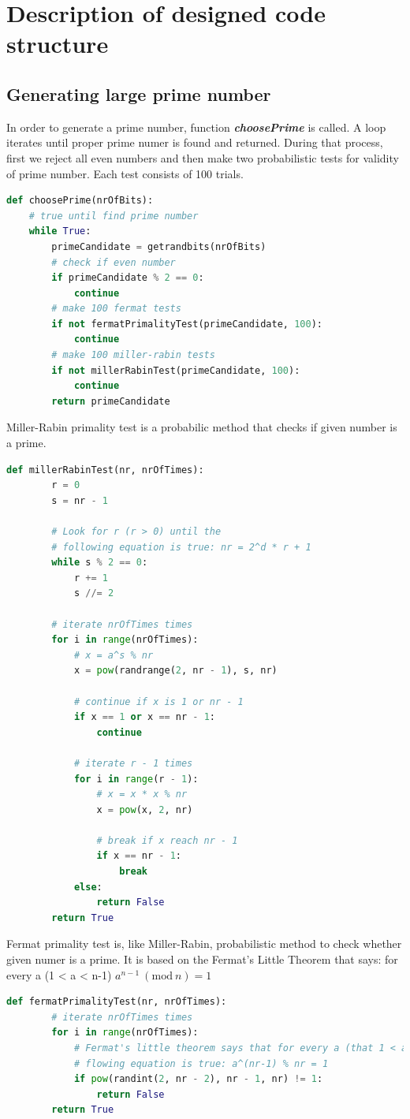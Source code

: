 \documentclass[a4paper,12pt]{article}
\newcommand{\Mod}[1]{\ (\mathrm{mod}\ #1)}
\begin{document}
\section{Description of designed code structure}
\subsection{Generating large prime number}
In order to generate a prime number, function \textbf{\textit{choosePrime}} is called. A loop iterates until proper prime numer is found and returned. 
During that process, first we reject all even numbers and then make two probabilistic tests for validity of prime number. Each test consists of 100 trials.
\begin{lstlisting}[language=Python]
  def choosePrime(nrOfBits):
    # true until find prime number
    while True:
        primeCandidate = getrandbits(nrOfBits)
        # check if even number
        if primeCandidate % 2 == 0:
            continue
        # make 100 fermat tests 
        if not fermatPrimalityTest(primeCandidate, 100):
            continue
        # make 100 miller-rabin tests
        if not millerRabinTest(primeCandidate, 100):
            continue
        return primeCandidate
\end{lstlisting}
Miller-Rabin primality test is a probabilic method that checks if given number is a prime.
\begin{lstlisting}[language=Python]
    def millerRabinTest(nr, nrOfTimes):
        r = 0 
        s = nr - 1

        # Look for r (r > 0) until the
        # following equation is true: nr = 2^d * r + 1
        while s % 2 == 0:
            r += 1
            s //= 2

        # iterate nrOfTimes times
        for i in range(nrOfTimes):
            # x = a^s % nr
            x = pow(randrange(2, nr - 1), s, nr)

            # continue if x is 1 or nr - 1
            if x == 1 or x == nr - 1:
                continue

            # iterate r - 1 times
            for i in range(r - 1):
                # x = x * x % nr
                x = pow(x, 2, nr)

                # break if x reach nr - 1
                if x == nr - 1:
                    break
            else:
                return False
        return True
\end{lstlisting}
\newpage
Fermat primality test is, like Miller-Rabin, probabilistic method to check whether given numer is a prime. It is based on the Fermat's Little Theorem that says: for every a (1 < a < n-1) $ a^{n-1} \Mod n = 1 $
\begin{lstlisting}[language=Python]
    def fermatPrimalityTest(nr, nrOfTimes):
        # iterate nrOfTimes times
        for i in range(nrOfTimes):
            # Fermat's little theorem says that for every a (that 1 < a < nr-1)
            # flowing equation is true: a^(nr-1) % nr = 1
            if pow(randint(2, nr - 2), nr - 1, nr) != 1:
                return False
        return True
\end{lstlisting}
\end{document}
